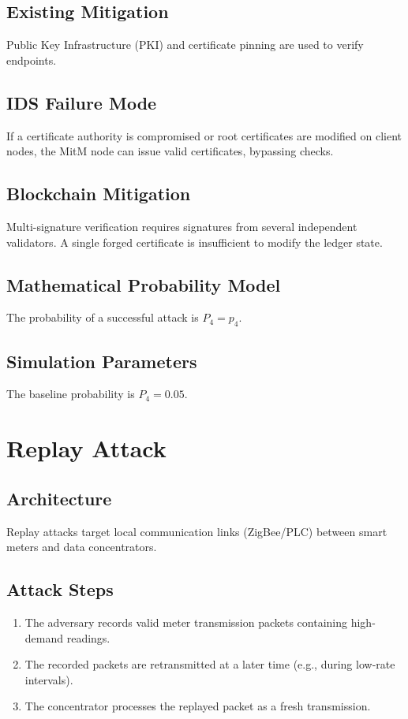 \documentclass[12pt, oneside, a4paper]{report}
\theoremstyle{definition}
\theoremstyle{remark}
\begin{document}
\subsection{Existing Mitigation}
Public Key Infrastructure (PKI) and certificate pinning are used to verify endpoints.

\subsection{IDS Failure Mode}
If a certificate authority is compromised or root certificates are modified on client nodes, the MitM node can issue valid certificates, bypassing checks.

\subsection{Blockchain Mitigation}
Multi-signature verification requires signatures from several independent validators. A single forged certificate is insufficient to modify the ledger state.

\subsection{Mathematical Probability Model}
The probability of a successful attack is $P_4 = p_4$.

\subsection{Simulation Parameters}
The baseline probability is $P_4 = 0.05$.

\bigskip

\section{Replay Attack}
\label{sec:tm:replay}

\subsection{Architecture}
Replay attacks target local communication links (ZigBee/PLC) between smart meters and data concentrators.

\subsection{Attack Steps}
\begin{enumerate}
  \item The adversary records valid meter transmission packets containing high-demand readings.
  \item The recorded packets are retransmitted at a later time (e.g., during low-rate intervals).
  \item The concentrator processes the replayed packet as a fresh transmission.
\end{enumerate}
\end{document}
